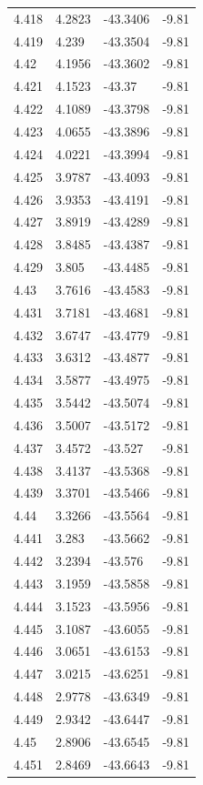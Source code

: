 \begin{tabular}{llll}
4.418 & 4.2823 & -43.3406 & -9.81 \\
4.419 & 4.239 & -43.3504 & -9.81 \\
4.42 & 4.1956 & -43.3602 & -9.81 \\
4.421 & 4.1523 & -43.37 & -9.81 \\
4.422 & 4.1089 & -43.3798 & -9.81 \\
4.423 & 4.0655 & -43.3896 & -9.81 \\
4.424 & 4.0221 & -43.3994 & -9.81 \\
4.425 & 3.9787 & -43.4093 & -9.81 \\
4.426 & 3.9353 & -43.4191 & -9.81 \\
4.427 & 3.8919 & -43.4289 & -9.81 \\
4.428 & 3.8485 & -43.4387 & -9.81 \\
4.429 & 3.805 & -43.4485 & -9.81 \\
4.43 & 3.7616 & -43.4583 & -9.81 \\
4.431 & 3.7181 & -43.4681 & -9.81 \\
4.432 & 3.6747 & -43.4779 & -9.81 \\
4.433 & 3.6312 & -43.4877 & -9.81 \\
4.434 & 3.5877 & -43.4975 & -9.81 \\
4.435 & 3.5442 & -43.5074 & -9.81 \\
4.436 & 3.5007 & -43.5172 & -9.81 \\
4.437 & 3.4572 & -43.527 & -9.81 \\
4.438 & 3.4137 & -43.5368 & -9.81 \\
4.439 & 3.3701 & -43.5466 & -9.81 \\
4.44 & 3.3266 & -43.5564 & -9.81 \\
4.441 & 3.283 & -43.5662 & -9.81 \\
4.442 & 3.2394 & -43.576 & -9.81 \\
4.443 & 3.1959 & -43.5858 & -9.81 \\
4.444 & 3.1523 & -43.5956 & -9.81 \\
4.445 & 3.1087 & -43.6055 & -9.81 \\
4.446 & 3.0651 & -43.6153 & -9.81 \\
4.447 & 3.0215 & -43.6251 & -9.81 \\
4.448 & 2.9778 & -43.6349 & -9.81 \\
4.449 & 2.9342 & -43.6447 & -9.81 \\
4.45 & 2.8906 & -43.6545 & -9.81 \\
4.451 & 2.8469 & -43.6643 & -9.81 \\

\end{tabular}
